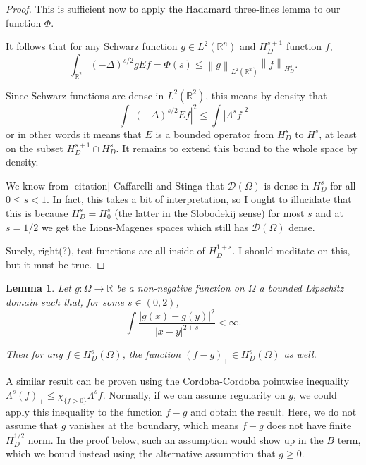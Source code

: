 \documentclass[11pt]{amsart}
\newtheorem{lemma}[theorem]{Lemma}
\theoremstyle{remark}
\theoremstyle{definition}
\newcommand{\R}{\mathbb{R}}
\newcommand{\norm}[1]{\left\lVert#1\right\rVert}
\newcommand{\paren}[1]{\left( #1 \right)}
\newcommand{\abs}[1]{\left\lvert #1 \right\rvert}
\newcommand{\Laplace}{\Delta}
\newcommand{\indic}[1]{\chi_{\{#1\}}}
\newcommand{\test}{\mathcal{D}}
\begin{document}
\begin{proof}
This is sufficient now to apply the Hadamard three-lines lemma to our function $\Phi$.  

It follows that for any Schwarz function $g \in L^2(\R^n)$ and $H_D^{s+1}$ function $f$, 
\[ \int_{\R^2} \paren{-\Laplace}^{s/2} g E f = \Phi(s) \leq \norm{g}_{L^2(\R^2)} \norm{f}_{H_D^s}. \]

Since Schwarz functions are dense in $L^2(\R^2)$, this means by density that 
\[ \int \abs{ \paren{-\Laplace}^{s/2} E f }^2 \leq \int \abs{\Lambda^s f}^2 \]
or in other words it means that $E$ is a bounded operator from $H_D^s$ to $H^s$, at least on the subset $H_D^{s+1} \cap H_D^s$.  It remains to extend this bound to the whole space by density.  

We know from [citation] Caffarelli and Stinga that $\test(\Omega)$ is dense in $H_D^s$ for all $0 \leq s < 1$.  In fact, this takes a bit of interpretation, so I ought to illucidate that this is because $H_D^s = H_0^s$ (the latter in the Slobodekij sense) for most $s$ and at $s=1/2$ we get the Lions-Magenes spaces which still has $\test(\Omega)$ dense.  

Surely, right(?), test functions are all inside of $H_D^{1+s}$.  I should meditate on this, but it must be true.  
\end{proof}

\begin{lemma}
Let $g:\Omega \to \R$ be a non-negative function on $\Omega$ a bounded Lipschitz domain such that, for some $s \in (0,2)$,
\[ \int \frac{|g(x)-g(y)|^2}{|x-y|^{2+s}} < \infty. \]

Then for any $f \in H_D^s(\Omega)$, the function $(f-g)_+ \in H_D^s(\Omega)$ as well.  
\end{lemma}

A similar result can be proven using the Cordoba-Cordoba pointwise inequality $\Lambda^s (f)_+ \leq \indic{f>0} \Lambda^s f$.  Normally, if we can assume regularity on $g$, we could apply this inequality to the function $f-g$ and obtain the result. Here, we do not assume that $g$ vanishes at the boundary, which means $f-g$ does not have finite $H_D^{1/2}$ norm.  In the proof below, such an assumption would show up in the $B$ term, which we bound instead using the alternative assumption that $g \geq 0$.  
\end{document}
